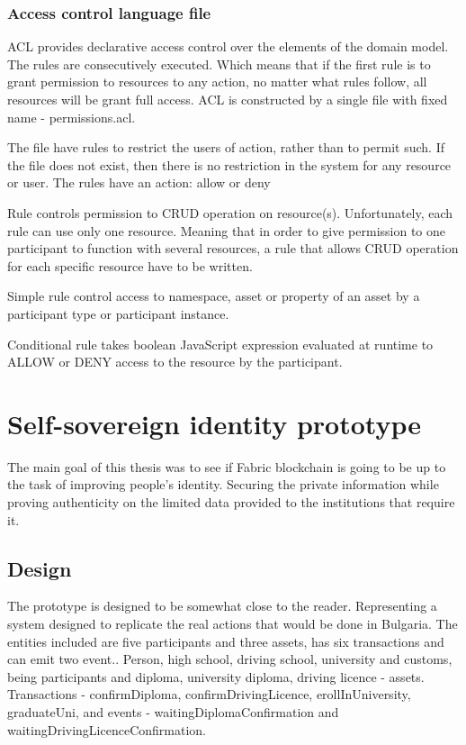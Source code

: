 \documentclass[a4paper,11pt]{report}
\begin{document}
\subsection{Access control language file}
ACL provides declarative access control over the elements of the domain model. The rules are consecutively executed. Which means that if the first rule is to grant permission to resources to any action, no matter what rules follow, all resources will be grant full access. ACL is constructed by a single file with fixed name - permissions.acl. 

The file have rules to restrict the users of action, rather than to permit such. If the file does not exist, then there is no restriction in the system for any resource or user. The rules have an action: allow or deny

Rule controls permission to CRUD operation on resource(s). Unfortunately, each rule can use only one resource. Meaning that in order to give permission to one participant to function with several resources, a rule that allows CRUD operation for each specific resource have to be written.  

Simple rule control access to namespace, asset or property of an asset by a participant type or participant instance.

Conditional rule takes boolean JavaScript expression evaluated at runtime to ALLOW or DENY access to the resource by the participant.


\chapter{Self-sovereign identity prototype}
\label{usecase}

The main goal of this thesis was to see if Fabric blockchain is going to be up to the task of improving people’s identity. Securing the private information while proving authenticity on the limited data provided to the institutions that require it.  

\section{Design}

The prototype is designed to be somewhat close to the reader. Representing a system designed to replicate the real actions that would be done in Bulgaria. The entities included are five participants and three assets, has six transactions and can emit two event.. Person, high school, driving school, university and customs, being participants and diploma, university diploma, driving licence - assets. Transactions - confirmDiploma, confirmDrivingLicence, erollInUniversity, graduateUni, and events - waitingDiplomaConfirmation and waitingDrivingLicenceConfirmation. 
\end{document}
